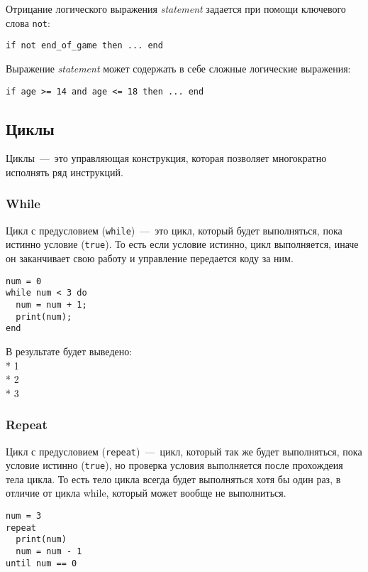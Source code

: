 Отрицание логического выражения \emph{statement} задается при помощи ключевого слова \lstinline{not}:

\begin{lstlisting}
if not end_of_game then ... end
\end{lstlisting}

Выражение \emph{statement} может содержать в себе сложные логические выражения:

\begin{lstlisting}
if age >= 14 and age <= 18 then ... end
\end{lstlisting}

\subsection{Циклы}

Циклы~---~это управляющая конструкция, которая позволяет многократно исполнять ряд инструкций.

\subsubsection{While}

Цикл с предусловием (\lstinline{while})~---~это цикл, который будет выполняться, пока истинно условие (\lstinline{true}). То есть если условие истинно, цикл выполняется, иначе он заканчивает свою работу и управление передается коду за ним. 

\begin{lstlisting}
num = 0
while num < 3 do
  num = num + 1;
  print(num);
end     
\end{lstlisting}

В результате будет выведено: 
\\* 1 
\\* 2
\\* 3

\subsubsection{Repeat}

Цикл с предусловием (\lstinline{repeat})~---~цикл, который так же будет выполняться, пока условие истинно (\lstinline{true}), но проверка условия выполняется после прохождеия тела цикла. То есть тело цикла всегда будет выполняться хотя бы один раз, в отличие от цикла while, который может вообще не выполниться. 

\begin{lstlisting}
num = 3
repeat
  print(num)
  num = num - 1
until num == 0    
\end{lstlisting}

